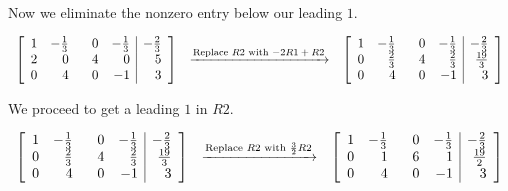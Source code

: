 \documentclass{ximera}
\begin{document}
\begin{example}
\[\begin{array}{ccc}
 \end{array}\]

Now we eliminate the nonzero entry below our leading $1$.

\[ \begin{array}{ccc}

 \left[ \begin{array}{rrrr|r}
 1 & -\frac{1}{3} & \hphantom{-}0 & -\frac{1}{3} & -\frac{2}{3} \\
 2 & 0 & 4 & 0 & 5 \\
  0 & 4 & 0 & -1 & 3 \\  \end{array} \right]
&

\xrightarrow{\text{Replace $R2$ with $-2R1+R2$}}

&

 \left[ \begin{array}{rrrr|r}
 1 & -\frac{1}{3} & \hphantom{-}0 & -\frac{1}{3} & -\frac{2}{3} \\  
 0 & \frac{2}{3} & 4 & \frac{2}{3} & \frac{19}{3} \\  
 0 & 4 & 0 & -1 & 3 \\  \end{array} \right]

 \end{array}\]

We proceed to get a leading $1$ in $R2$.

\[ \begin{array}{ccc}


 \left[ \begin{array}{rrrr|r}
 1 & -\frac{1}{3} & \hphantom{-}0 & -\frac{1}{3} & -\frac{2}{3} \\  
 0 & \frac{2}{3} & 4 & \frac{2}{3} & \frac{19}{3} \\  
 0 & 4 & 0 & -1 & 3 \\  \end{array} \right]

&

\xrightarrow{\text{Replace $R2$ with $\frac{3}{2}R2$}}

&

 \left[ \begin{array}{rrrr|r}
 1 & -\frac{1}{3} & \hphantom{-}0 & -\frac{1}{3} & -\frac{2}{3} \\  
 0 & 1 & 6 & 1 & \frac{19}{2} \\  
 0 & 4 & 0 & -1 & 3 \\  \end{array} \right]

 \end{array}\]
 

\end{example}
\end{document}

